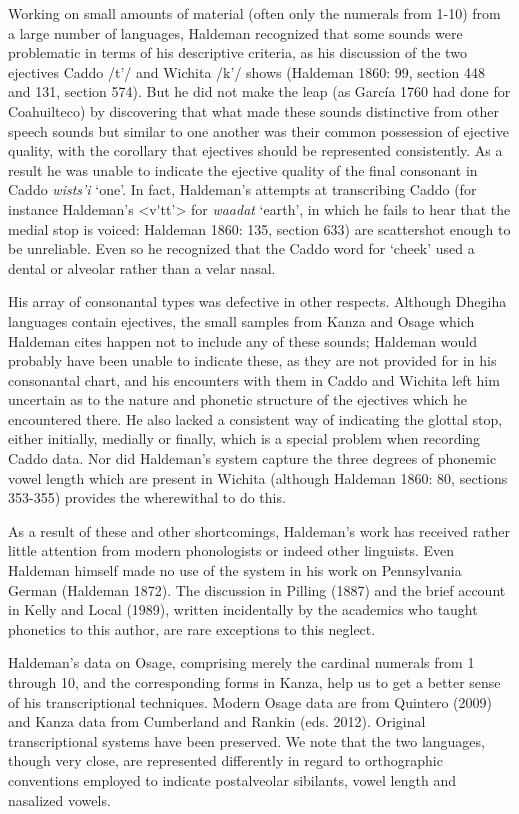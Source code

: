 \documentclass[output=paper]{LSP/langsci}
\begin{document}
Working on small amounts of material (often only the numerals from 1-10) from a large number of languages, Haldeman recognized that some sounds were problematic in terms of his descriptive criteria, as his discussion of the two ejectives  Caddo /t'/ and Wichita /k'/ shows (Haldeman 1860: 99, section 448 and 131, section 574).  But he did not make the leap (as Garc\'ia 1760 had done for Coahuilteco) by discovering that what made these sounds distinctive from other speech sounds but similar to one another was their common possession of ejective quality, with the corollary that ejectives should be represented consistently.  As a result he was unable to indicate the ejective quality of the final consonant in Caddo \textit{wists'i} `one'.  In fact, Haldeman's attempts at transcribing Caddo (for instance Haldeman's <v\'{}tt'> for \textit{waadat} `earth', in which he fails to hear that the medial stop is voiced: Haldeman 1860: 135, section 633) are scattershot enough to be unreliable. Even so he recognized that the Caddo word for `cheek'  used a dental or alveolar rather than a velar nasal.    

His array of consonantal types was defective in other respects. Although Dhegiha languages contain ejectives, the small samples from Kanza and Osage which Haldeman cites happen not to include any of these sounds; Haldeman would probably have been unable to indicate these, as they are not provided for in his consonantal chart, and his encounters with them in Caddo and Wichita left him uncertain as to the nature and phonetic structure of the ejectives which he encountered there.  He also lacked a consistent way of indicating the glottal stop, either initially, medially or finally, which is a special problem when recording Caddo data. Nor did Haldeman's system capture the three degrees of phonemic vowel length which are present in Wichita (although Haldeman 1860: 80, sections 353-355) provides the wherewithal to do this.  

As a result of these and other shortcomings, Haldeman's work has received rather little attention from modern phonologists or indeed other linguists.  Even Haldeman himself made no use of the system in his work on Pennsylvania German (Haldeman 1872).  The discussion in Pilling (1887) and the brief account in Kelly and Local (1989), written incidentally by the academics who taught phonetics to this author, are  rare exceptions to this neglect.   

Haldeman's data on Osage, comprising merely the cardinal numerals from 1 through 10, and the corresponding forms in Kanza, help us to get a better sense of his transcriptional techniques. Modern Osage data are from Quintero (2009) and Kanza data from Cumberland and Rankin (eds. 2012).  Original transcriptional systems have been preserved. We note that the two languages, though very close, are represented differently in regard to orthographic conventions employed to indicate postalveolar sibilants, vowel length and nasalized vowels. 
\end{document}
